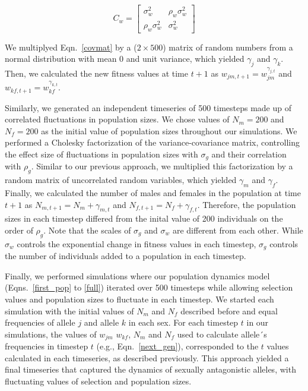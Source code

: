\begin{equation}
C_{w} = \begin{bmatrix}
\sigma_{w}^{2} & \rho_{w} \sigma_{w}^{2} \\
\rho_{w} \sigma_{w}^{2} & \sigma_{w}^{2}
\end{bmatrix}
\label{covmat}
\end{equation}

We multiplyed Eqn.~\ref{covmat} by a ($2 \times 500$) matrix of random numbers from a normal distribution with mean 0 and unit variance, which yielded $\gamma_{j}$ and $\gamma_{k}$. Then, we calculated the new fitness values at time $t+1$ as $w_{jm,t+1} = w_{jm}^{\gamma_{j,t}}$ and $w_{kf,t+1} = w_{kf}^{\gamma_{k,t}}$.

Similarly, we generated an independent timeseries of 500 timesteps made up of correlated fluctuations in population sizes. We chose values of $N_{m}= 200$ and $N_{f}=200$ as the initial value of population sizes throughout our simulations. We performed a Cholesky factorization of the variance-covariance matrix, controlling the effect size of fluctuations in population sizes with $\sigma_{g}$ and their correlation with $\rho_{g}$. Similar to our previous approach, we multiplied this factorization by a random matrix of uncorrelated random variables, which yielded $\gamma_{m}$ and $\gamma_{f}$. Finally, we calculated the number of males and females in the population at time $t+1$ as $N_{m,t+1} = N_{m} + \gamma_{m,t}$ and $N_{f,t+1} = N_{f}+ \gamma_{f,t} $. Therefore, the population sizes in each timestep differed from the inital value of 200 individuals on the order of $\rho_{g}$. Note that the scales of $\sigma_{g}$ and  $\sigma_{w}$ are different from each other. While $\sigma_{w}$ controls the exponential change in fitness values in each timestep, $\sigma_{g}$ controls the number of individuals added to a population in each timestep.



Finally, we performed simulations where our population dynamics model (Eqns.~\ref{first_pop} to \ref{full}) iterated over 500 timesteps while allowing selection values and population sizes to fluctuate in each timestep. We started each simulation with the initial values of $N_{m}$ and $N_{f}$ described before and equal frequencies of allele $j$ and allele $k$ in each sex. For each timestep $t$ in our simulations, the values of $w_{jm}$ $w_{kf}$, $N_{m}$ and $N_{f}$ used to calculate allele´s frequencies in timestep $t$ (e.g., Eqn.~\ref{next_gen}), corresponded to the $t$ values calculated in each timeseries, as described previously. This approach yielded a final timeseries that captured the dynamics of sexually antagonistic alleles, with fluctuating values of selection and population sizes.

